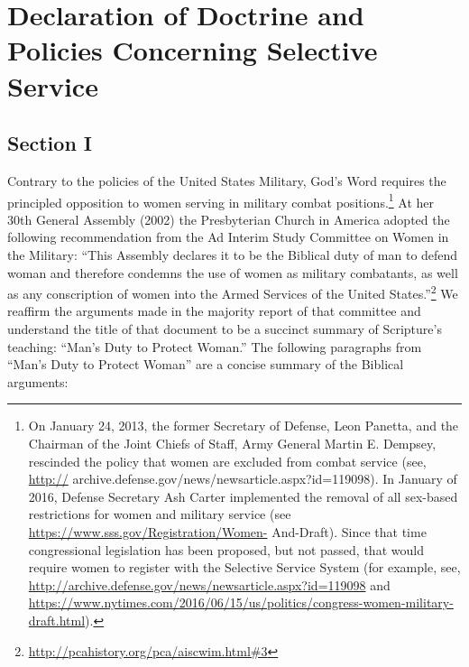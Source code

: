 \documentclass[
]{book}
\begin{document}
\begin{quote}
\begin{enumerate}
\end{enumerate}
\end{quote}

\hypertarget{declaration-of-doctrine-and-policies-concerning-selective-service}{%
\chapter{Declaration of Doctrine and Policies Concerning Selective Service}\label{declaration-of-doctrine-and-policies-concerning-selective-service}}

\hypertarget{section-i}{%
\section{Section I}\label{section-i}}

Contrary to the policies of the United States Military, God's Word requires the principled opposition to women serving in military combat positions.\footnote{On January 24, 2013, the former Secretary of Defense, Leon Panetta, and the Chairman of the Joint Chiefs of Staff, Army General Martin E. Dempsey, rescinded the policy that women are excluded from combat service (see, \url{http://} archive.defense.gov/news/newsarticle.aspx?id=119098). In January of 2016, Defense Secretary Ash Carter implemented the removal of all sex-based restrictions for women and military service (see \url{https://www.sss.gov/Registration/Women-} And-Draft). Since that time congressional legislation has been proposed, but not passed, that would require women to register with the Selective Service System (for example, see, \url{http://archive.defense.gov/news/newsarticle.aspx?id=119098} and \url{https://www.nytimes.com/2016/06/15/us/politics/congress-women-military-draft.html}).} At her 30th General Assembly (2002) the Presbyterian Church in America adopted the following recommendation from the Ad Interim Study Committee on Women in the Military: ``This Assembly declares it to be the Biblical duty of man to defend woman and therefore condemns the use of women as military combatants, as well as any conscription of women into the Armed Services of the United States.''\footnote{\url{http://pcahistory.org/pca/aiscwim.html\#3}} We reaffirm the arguments made in the majority report of that committee and understand the title of that document to be a succinct summary of Scripture's teaching: ``Man's Duty to Protect Woman.'' The following paragraphs from ``Man's Duty to Protect Woman'' are a concise summary of the Biblical arguments:
\end{document}
